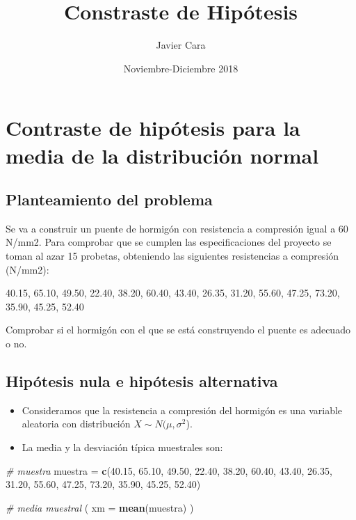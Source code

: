 \documentclass[]{article}
\title{Constraste de Hipótesis}
\author{Javier Cara}
\date{Noviembre-Diciembre 2018}
\newenvironment{Shaded}{\begin{snugshade}}{\end{snugshade}}
\newcommand{\KeywordTok}[1]{\textcolor[rgb]{0.13,0.29,0.53}{\textbf{#1}}}
\newcommand{\DataTypeTok}[1]{\textcolor[rgb]{0.13,0.29,0.53}{#1}}
\newcommand{\FloatTok}[1]{\textcolor[rgb]{0.00,0.00,0.81}{#1}}
\newcommand{\StringTok}[1]{\textcolor[rgb]{0.31,0.60,0.02}{#1}}
\newcommand{\CommentTok}[1]{\textcolor[rgb]{0.56,0.35,0.01}{\textit{#1}}}
\newcommand{\NormalTok}[1]{#1}
\begin{document}
\maketitle

{
\setcounter{tocdepth}{2}
\tableofcontents
}
\section{Contraste de hipótesis para la media de la distribución
normal}\label{contraste-de-hipotesis-para-la-media-de-la-distribucion-normal}

\subsection{Planteamiento del
problema}\label{planteamiento-del-problema}

Se va a construir un puente de hormigón con resistencia a compresión
igual a 60 N/mm2. Para comprobar que se cumplen las especificaciones del
proyecto se toman al azar 15 probetas, obteniendo las siguientes
resistencias a compresión (N/mm2):

40.15, 65.10, 49.50, 22.40, 38.20, 60.40, 43.40, 26.35, 31.20, 55.60,
47.25, 73.20, 35.90, 45.25, 52.40

Comprobar si el hormigón con el que se está construyendo el puente es
adecuado o no.

\subsection{Hipótesis nula e hipótesis
alternativa}\label{hipotesis-nula-e-hipotesis-alternativa}

\begin{itemize}
\item
  Consideramos que la resistencia a compresión del hormigón es una
  variable aleatoria con distribución \(X \sim N(\mu, \sigma^2\)).
\item
  La media y la desviación típica muestrales son:
\end{itemize}

\begin{Shaded}
\begin{Highlighting}[]
\CommentTok{# muestra}
\NormalTok{muestra =}\StringTok{ }\KeywordTok{c}\NormalTok{(}\FloatTok{40.15}\NormalTok{, }\FloatTok{65.10}\NormalTok{, }\FloatTok{49.50}\NormalTok{, }\FloatTok{22.40}\NormalTok{, }\FloatTok{38.20}\NormalTok{, }\FloatTok{60.40}\NormalTok{, }\FloatTok{43.40}\NormalTok{, }\FloatTok{26.35}\NormalTok{, }\FloatTok{31.20}\NormalTok{, }\FloatTok{55.60}\NormalTok{, }\FloatTok{47.25}\NormalTok{, }\FloatTok{73.20}\NormalTok{, }\FloatTok{35.90}\NormalTok{, }\FloatTok{45.25}\NormalTok{, }\FloatTok{52.40}\NormalTok{)}

\CommentTok{# media muestral}
\NormalTok{( }\DataTypeTok{xm =} \KeywordTok{mean}\NormalTok{(muestra) )}
\end{Highlighting}
\end{Shaded}
\end{document}
